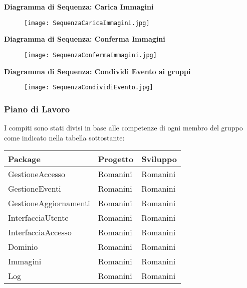 \textbf{Diagramma di Sequenza: Carica Immagini}

\begin{figure}[h!]
    \begin{center}
        \texttt{[image: SequenzaCaricaImmagini.jpg]}
    \end{center}
\end{figure}
\hfill \break

\textbf{Diagramma di Sequenza: Conferma Immagini}

\begin{figure}[h!]
    \begin{center}
        \texttt{[image: SequenzaConfermaImmagini.jpg]}
    \end{center}
\end{figure}
\hfill \break
\newpage

\textbf{Diagramma di Sequenza: Condividi Evento ai gruppi}

\begin{figure}[h!]
    \begin{center}
        \texttt{[image: SequenzaCondividiEvento.jpg]}
    \end{center}
\end{figure}
\hfill \break

\newpage
\subsubsection{Piano di Lavoro}

I compiti sono stati divisi in base alle competenze di
ogni membro del gruppo come indicato nella tabella sottostante:
\hfill \break

\begin{tabular} {|P{5cm}|P{5cm}|P{5cm}|} %
    \hline
    \textbf{Package}      & \textbf{Progetto} & \textbf{Sviluppo} \\
    \hline
    GestioneAccesso       & Romanini          & Romanini          \\
    \hline
    GestioneEventi        & Romanini          & Romanini          \\
    \hline
    GestioneAggiornamenti & Romanini          & Romanini          \\
    \hline
    InterfacciaUtente     & Romanini          & Romanini          \\
    \hline
    InterfacciaAccesso    & Romanini          & Romanini          \\
    \hline
    Dominio               & Romanini          & Romanini          \\
    \hline
    Immagini              & Romanini          & Romanini          \\
    \hline
    Log                   & Romanini          & Romanini          \\
    \hline
\end{tabular}
\hfill \break

